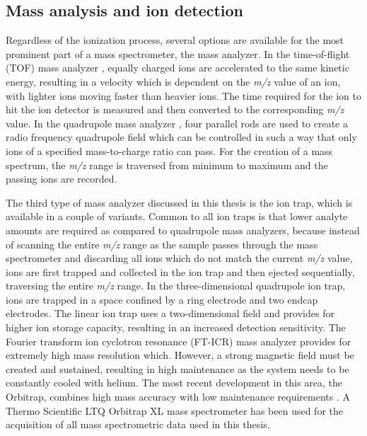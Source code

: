 \subsection{Mass analysis and ion detection}

Regardless of the ionization process, several options are available for
the most prominent part of a mass spectrometer, the mass analyzer.
In the time-of-flight (TOF) mass analyzer \citep{Wolff1953}, equally charged 
ions are accelerated to the same kinetic energy, resulting in a velocity 
which is dependent on the {\em m/z} value of an ion, with lighter ions
moving faster than heavier ions.
The time required for the ion to hit the ion detector is measured and
then converted to the corresponding {\em m/z} value.
In the quadrupole mass analyzer \citep{Paul1956}, four parallel rods are 
used to create a radio frequency quadrupole field which can be controlled
in such a way that only ions of a specified mass-to-charge ratio can pass.
For the creation of a mass spectrum, the {\em m/z} range is traversed from
minimum to maximum and the passing ions are recorded.


The third type of mass analyzer discussed in this thesis is the ion trap,
which is available in a couple of variants.
Common to all ion traps is that lower analyte amounts are required as
compared to quadrupole mass analyzers, because instead of scanning
the entire {\em m/z} range as the sample passes through the mass spectrometer 
and discarding all ions which do not match the current {\em m/z} value, 
ions are first trapped and collected in the ion trap and then ejected 
sequentially, traversing the entire {\em m/z} range.
In the three-dimensional quadrupole ion trap, ions are trapped in a space
confined by a ring electrode and two endcap electrodes.
The linear ion trap uses a two-dimensional field and provides for higher ion
storage capacity, resulting in an increased detection sensitivity.
The Fourier transform ion cyclotron resonance (FT-ICR) mass analyzer provides
for extremely high mass resolution which.
However, a strong magnetic field must be created and sustained, resulting
in high maintenance as the system needs to be constantly cooled with helium. 
The most recent development in this area, the Orbitrap, combines high mass 
accuracy with low maintenance requirements \citep{Hu2005}. 
A Thermo Scientific LTQ Orbitrap XL mass spectrometer has been used for the
acquisition of all mass spectrometric data used in this thesis.

